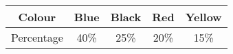 \begin{tabular}{|c|c|c|c|c|}
    \hline
    Colour & Blue & Black & Red & Yellow \\
    \hline
    Percentage & 40\% & 25\% & 20\% & 15\% \\
    \hline
\end{tabular}
